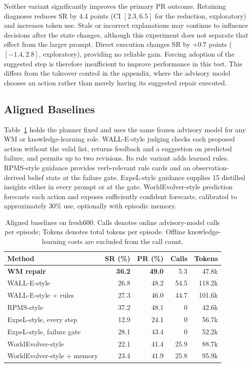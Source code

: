 \documentclass[runningheads]{llncs}
\begin{document}
Neither variant significantly improves the primary PR outcome. Retaining diagnoses reduces SR by 4.4 points (CI $[2.3,6.5]$ for the reduction, exploratory) and increases token use. Stale or incorrect explanations may continue to influence decisions after the state changes, although this experiment does not separate that effect from the larger prompt. Direct execution changes SR by $+0.7$ points ($[-1.4,2.8]$, exploratory), providing no reliable gain. Forcing adoption of the suggested step is therefore insufficient to improve performance in this test. This differs from the takeover control in the appendix, where the advisory model chooses an action rather than merely having its suggested repair executed.

\subsection{Aligned Baselines}
Table~\ref{tab:baselines} holds the planner fixed and uses the same frozen advisory model for any WM or knowledge-learning role. WALL-E-style judging checks each proposed action without the valid list, returns feedback and a suggestion on predicted failure, and permits up to two revisions. Its rule variant adds learned rules. RPMS-style guidance provides verb-relevant rule cards and an observation-derived belief state at the failure gate. ExpeL-style guidance supplies 15 distilled insights either in every prompt or at the gate. WorldEvolver-style prediction forecasts each action and exposes sufficiently confident forecasts, calibrated to approximately 30\% use, optionally with episodic memory.

\begin{table}[tbp]
\caption{Aligned baselines on fresh600. Calls denotes online advisory-model calls per episode; Tokens denotes total tokens per episode. Offline knowledge-learning costs are excluded from the call count.}
\label{tab:baselines}\centering
\begin{tabular}{lrrrr}\toprule
Method & SR (\%) & PR (\%) & Calls & Tokens\\\midrule
\textbf{WM repair} & \textbf{36.2} & \textbf{49.0} & 5.3 & 47.8k\\
WALL-E-style & 26.8 & 48.2 & 54.5 & 118.2k\\
WALL-E-style + rules & 27.3 & 46.0 & 44.7 & 101.6k\\
RPMS-style & 37.2 & 48.1 & 0 & 42.6k\\
ExpeL-style, every step & 12.9 & 24.1 & 0 & 56.7k\\
ExpeL-style, failure gate & 28.1 & 43.4 & 0 & 52.2k\\
WorldEvolver-style & 22.1 & 41.4 & 25.9 & 88.7k\\
WorldEvolver-style + memory & 23.4 & 41.9 & 25.8 & 95.9k\\\bottomrule
\end{tabular}
\end{table}
\end{document}

